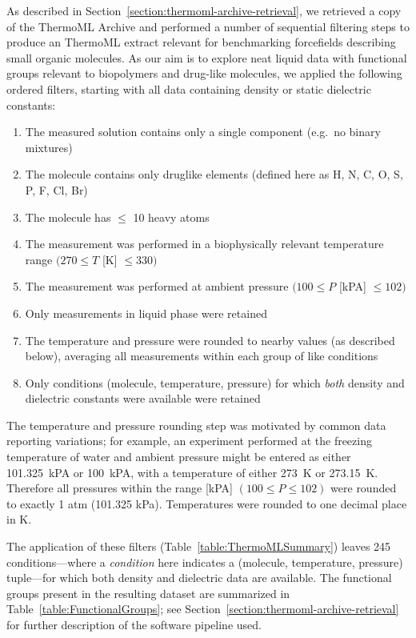 \documentclass[aps,pre,twocolumn,nofootinbib,superscriptaddress,linenumbers]{revtex4-1}
\begin{document}
As described in Section~\ref{section:thermoml-archive-retrieval}, we retrieved a copy of the ThermoML Archive and performed a number of sequential filtering steps to produce an ThermoML extract relevant for benchmarking forcefields describing small organic molecules.  
As our aim is to explore neat liquid data with functional groups relevant to biopolymers and drug-like molecules, we applied the following ordered filters, starting with all data containing density or static dielectric constants: 
\begin{enumerate}
 \item The measured solution contains only a single component (e.g.~no binary mixtures)
 \item The molecule contains only druglike elements (defined here as H, N, C, O, S, P, F, Cl, Br)
 \item The molecule has $\le$ 10 heavy atoms
 \item The measurement was performed in a biophysically relevant temperature range $(270 \le T$ [K] $\le 330)$
 \item The measurement was performed at ambient pressure $(100 \le P$ [kPA]  $\le 102)$
 \item Only measurements in liquid phase were retained
 \item The temperature and pressure were rounded to nearby values (as described below), averaging all measurements within each group of like conditions
 \item Only conditions (molecule, temperature, pressure) for which \emph{both} density and dielectric constants were available were retained
\end{enumerate}
The temperature and pressure rounding step was motivated by common data reporting variations; for example, an experiment performed at the freezing temperature of water and ambient pressure might be entered as either 101.325~kPA or 100~kPA, with a temperature of either 273~K or 273.15~K.  
Therefore all pressures within the range [kPA] $(100 \le P \le 102)$ were rounded to exactly 1 atm (101.325 kPa).  
Temperatures were rounded to one decimal place in K. 

The application of these filters (Table~\ref{table:ThermoMLSummary}) leaves 245 conditions---where a \emph{condition} here indicates a (molecule, temperature, pressure) tuple---for which both density and dielectric data are available.  
The functional groups present in the resulting dataset are summarized in Table~\ref{table:FunctionalGroups}; see Section~\ref{section:thermoml-archive-retrieval} for further description of the software pipeline used.  
\end{document}

